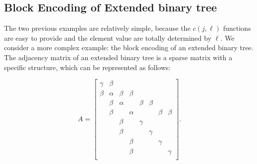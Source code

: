 \documentclass{article}
\begin{document}
    \subsection{Block Encoding of Extended binary tree}

    The two previous examples are relatively simple, because the $c(j, \ell)$ functions are easy to provide and the element value are totally determined by $\ell$. We consider a more complex example: the block encoding of an extended binary tree. The adjacency matrix of an extended binary tree is a sparse matrix with a specific structure, which can be represented as follows:

    \begin{figure}[htbp]
        \centering
        \begin{minipage}{0.35\textwidth}
            \centering
        \end{minipage}
        \hfill
        \begin{minipage}{0.6\textwidth}
            \centering
            \[
                A =
                \begin{bmatrix}
                    \gamma & \beta \\
                    \beta & \alpha & \beta & \beta \\
                    & \beta & \alpha & & \beta & \beta \\
                    & \beta & & \alpha & & & \beta & \beta  \\
                    & & \beta & & \gamma \\
                    & & \beta & & & \gamma \\
                    & & & \beta & & & \gamma \\
                    &       & & \beta  & & &       & \gamma \\
                \end{bmatrix}.
            \]
        \end{minipage}\label{fig:figure}
    \end{figure}
\end{document}
